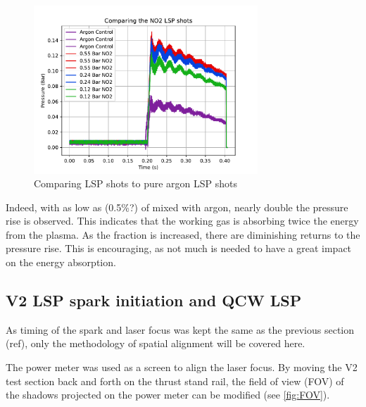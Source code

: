             \begin{figure}[!ht]
                \centering
                \includegraphics[width=0.75\textwidth]{assets/4 experiments/NO2_shots_analysis.pdf}
                \caption{Comparing  LSP shots to pure argon LSP shots}
                \label{fig:NO2_shots_analysis}
            \end{figure}

            Indeed, with as low as (0.5\%?) of  mixed with argon, nearly double the pressure rise is observed. This indicates that the working gas is absorbing twice the energy from the plasma. As the  fraction is increased, there are diminishing returns to the pressure rise. This is encouraging, as not much  is needed to have a great impact on the energy absorption.

        

        \subsection{V2 LSP spark initiation and QCW LSP}


            As timing of the spark and laser focus was kept the same as the previous section (ref), only the methodology of spatial alignment will be covered here.


            The power meter was used as a screen to align the laser focus. By moving the V2 test section back and forth on the thrust stand rail, the field of view (FOV) of the shadows projected on the power meter can be modified (see \autoref{fig:FOV}). 
            
